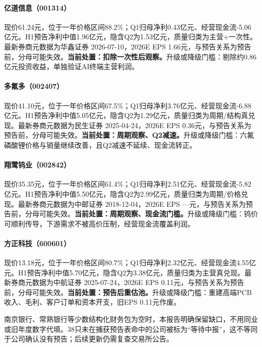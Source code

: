 \paragraph{亿道信息（001314）}
现价61.24元，位于一年价格区间88.2\%；Q1归母净利0.43亿元、经营现金流-5.06亿元。H1预告净利中值1.96亿元，隐含Q2为1.53亿元，质量归类为主营+一次性。最新券商元数据为华鑫证券 2026-07-10，2026E EPS 1.66元，与预告关系为预告前，分母可能失效。\textbf{当前处置：扣除一次性后观察。}升级或降级门槛：剔除约0.86亿元投资收益，单独验证AI终端主营利润。

\paragraph{多氟多（002407）}
现价41.10元，位于一年价格区间67.5\%；Q1归母净利3.76亿元、经营现金流-6.88亿元。H1预告净利中值5.05亿元，隐含Q2为1.29亿元，质量归类为周期/结构真兑现。最新券商元数据为民生证券 2025-04-24，2026E EPS 0.36元，与预告关系为预告前，分母可能失效。\textbf{当前处置：周期观察、Q2减速。}升级或降级门槛：六氟磷酸锂价格与销量继续改善，且Q2减速不延续、现金流转正。

\paragraph{翔鹭钨业（002842）}
现价35.35元，位于一年价格区间61.4\%；Q1归母净利2.51亿元、经营现金流-5.82亿元。H1预告净利中值5.50亿元，隐含Q2为2.99亿元，质量归类为周期/价格兑现。最新券商元数据为中邮证券 2018-12-04，2026E EPS ---元，与预告关系为预告前，分母可能失效。\textbf{当前处置：周期观察、现金流门槛。}升级或降级门槛：钨价可顺利传导，下游需求不被高价压制，经营现金流覆盖利润。

\paragraph{方正科技（600601）}
现价13.18元，位于一年价格区间80.7\%；Q1归母净利2.32亿元、经营现金流4.55亿元。H1预告净利中值5.70亿元，隐含Q2为3.38亿元，质量归类为主营真兑现。最新券商元数据为中航证券 2025-07-24，2026E EPS 0.11元，与预告关系为预告前，分母可能失效。\textbf{当前处置：预告后重估池。}升级或降级门槛：重建高端PCB收入、毛利、客户订单和资本开支，旧EPS 0.11元作废。

\begin{sourcequalitybox}[54只公司池的数据边界]
南京银行、常熟银行等少数结构化财务包为空时，本报告明确保留缺口，不用同业或旧年度数字代填。38只未在捕获预告表命中的公司被标为“等待中报”，这不等同于公司确认没有预告；后续更新仍需复查交易所公告。
\end{sourcequalitybox}

